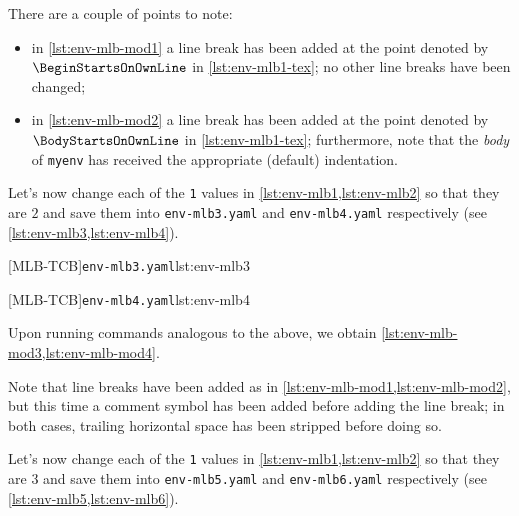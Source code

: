 	There are a couple of points to note: \begin{itemize} \item in \cref{lst:env-mlb-mod1} a line break has been added at the point denoted by $\BeginStartsOnOwnLine$ in \cref{lst:env-mlb1-tex}; no other line breaks have been changed;
		\item in \cref{lst:env-mlb-mod2} a line break has been added at the point denoted by $\BodyStartsOnOwnLine$ in \cref{lst:env-mlb1-tex}; furthermore, note that the \emph{body} of \texttt{myenv} has received the appropriate (default) indentation.
	\end{itemize}

	Let's now change each of the \texttt{1} values in \cref{lst:env-mlb1,lst:env-mlb2} so that they are $2$ and save them into \texttt{env-mlb3.yaml} and \texttt{env-mlb4.yaml} respectively (see \cref{lst:env-mlb3,lst:env-mlb4}).

	\begin{minipage}{.45\textwidth}
		[MLB-TCB]{\texttt{env-mlb3.yaml}}{lst:env-mlb3}
	\end{minipage}
	\hfill
	\begin{minipage}{.45\textwidth}
		[MLB-TCB]{\texttt{env-mlb4.yaml}}{lst:env-mlb4}
	\end{minipage}

	Upon running  commands analogous to the above, we obtain \cref{lst:env-mlb-mod3,lst:env-mlb-mod4}.

	\begin{widepage}
		\begin{minipage}{.56\linewidth}
		\end{minipage}
		\hfill
		\begin{minipage}{.43\linewidth}
		\end{minipage}
	\end{widepage}

	Note that line breaks have been added as in \cref{lst:env-mlb-mod1,lst:env-mlb-mod2}, but this time a comment symbol has been added before adding the line break; in both cases, trailing horizontal space has been stripped before doing so.

	Let's   now change each of the \texttt{1} values in \cref{lst:env-mlb1,lst:env-mlb2} so that they are $3$ and save them into \texttt{env-mlb5.yaml} and \texttt{env-mlb6.yaml} respectively (see \cref{lst:env-mlb5,lst:env-mlb6}).

